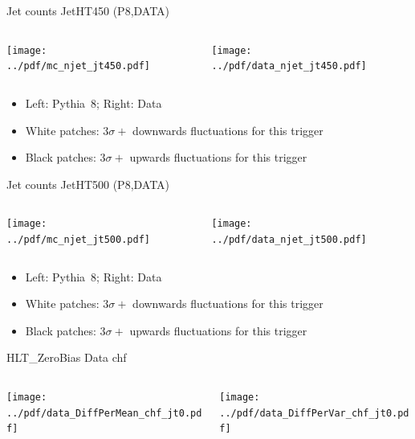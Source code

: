 \documentclass[9pt]{beamer}
\begin{document}
\begin{frame}[t]{Jet counts JetHT450 (P8,DATA)}
\begin{columns}[T]
  \begin{column}{.5\textwidth}
  \texttt{[image: ../pdf/mc\_njet\_jt450.pdf]}
  \end{column}
  \begin{column}{.5\textwidth}
  \texttt{[image: ../pdf/data\_njet\_jt450.pdf]}
  \end{column}
\end{columns}
\begin{itemize}
 \item Left: Pythia~8; Right: Data
 \item White patches: $3\sigma+$ downwards fluctuations for this trigger
 \item Black patches: $3\sigma+$ upwards fluctuations for this trigger
\end{itemize}
\end{frame}

\begin{frame}[t]{Jet counts JetHT500 (P8,DATA)}
\begin{columns}[T]
  \begin{column}{.5\textwidth}
  \texttt{[image: ../pdf/mc\_njet\_jt500.pdf]}
  \end{column}
  \begin{column}{.5\textwidth}
  \texttt{[image: ../pdf/data\_njet\_jt500.pdf]}
  \end{column}
\end{columns}
\begin{itemize}
 \item Left: Pythia~8; Right: Data
 \item White patches: $3\sigma+$ downwards fluctuations for this trigger
 \item Black patches: $3\sigma+$ upwards fluctuations for this trigger
\end{itemize}
\end{frame}


\begin{frame}[t]{HLT\_ZeroBias Data chf}
\begin{columns}[T]
  \begin{column}{.5\textwidth}
  \texttt{[image: ../pdf/data\_DiffPerMean\_chf\_jt0.pdf]}
  \end{column}
  \begin{column}{.5\textwidth}
  \texttt{[image: ../pdf/data\_DiffPerVar\_chf\_jt0.pdf]}
  \end{column}
\end{columns}
\end{frame}
\end{document}
